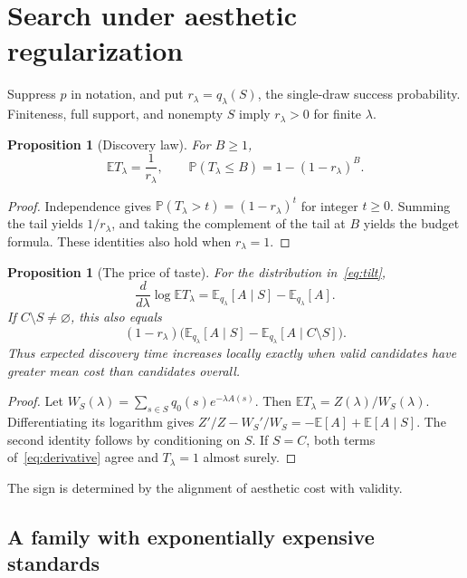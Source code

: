 \documentclass[11pt]{article}
\newtheorem{proposition}[definition]{Proposition}
\theoremstyle{remark}
\newcommand{\E}{\mathbb{E}}
\newcommand{\Prb}{\mathbb{P}}
\begin{document}
\section{Search under aesthetic regularization}

Suppress $p$ in notation, and put $r_\lambda=q_\lambda(S)$, the
single-draw success probability. Finiteness, full support, and nonempty
$S$ imply $r_\lambda>0$ for finite $\lambda$.

\begin{proposition}[Discovery law]\label{prop:geometric}
For $B\geq1$,
\[
 \E T_\lambda=\frac{1}{r_\lambda},\qquad
 \Prb(T_\lambda\leq B)=1-(1-r_\lambda)^B.
\]
\end{proposition}
\begin{proof}
Independence gives $\Prb(T_\lambda>t)=(1-r_\lambda)^t$ for integer
$t\geq0$. Summing the tail yields $1/r_\lambda$, and taking the
complement of the tail at $B$ yields the budget formula. These identities
also hold when $r_\lambda=1$.
\end{proof}

\begin{proposition}[The price of taste]\label{prop:derivative}
For the distribution in~\eqref{eq:tilt},
\begin{equation}\label{eq:derivative}
 \frac{d}{d\lambda}\log\E T_\lambda
 =\E_{q_\lambda}[A\mid S]-\E_{q_\lambda}[A].
\end{equation}
If $C\setminus S\ne\varnothing$, this also equals
\[
 (1-r_\lambda)
 \bigl(\E_{q_\lambda}[A\mid S]
       -\E_{q_\lambda}[A\mid C\setminus S]\bigr).
\]
Thus expected discovery time increases locally exactly when valid
candidates have greater mean cost than candidates overall.
\end{proposition}
\begin{proof}
Let $W_S(\lambda)=\sum_{s\in S}q_0(s)e^{-\lambda A(s)}$.
Then $\E T_\lambda=Z(\lambda)/W_S(\lambda)$. Differentiating its
logarithm gives $Z'/Z-W_S'/W_S=-\E[A]+\E[A\mid S]$.
The second identity follows by conditioning on $S$. If $S=C$, both
terms of~\eqref{eq:derivative} agree and $T_\lambda=1$ almost surely.
\end{proof}

The sign is determined by the alignment of aesthetic cost with validity.

\subsection{A family with exponentially expensive standards}
\end{document}
